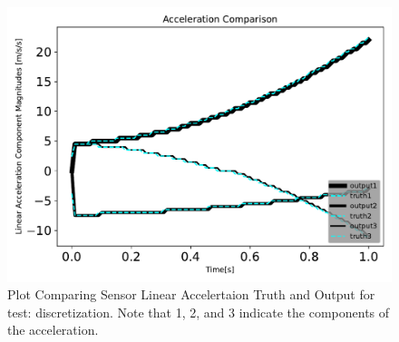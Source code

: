 \begin{figure}[htbp]\centerline{\includegraphics[height=0.7\textwidth, keepaspectratio]{AutoTeX/discretizationaccelComparison}}\caption{Plot Comparing Sensor Linear Accelertaion Truth and Output for test: discretization. Note that 1, 2, and 3 indicate the components of the acceleration.}\label{fig:discretizationaccelComparison}\end{figure}
